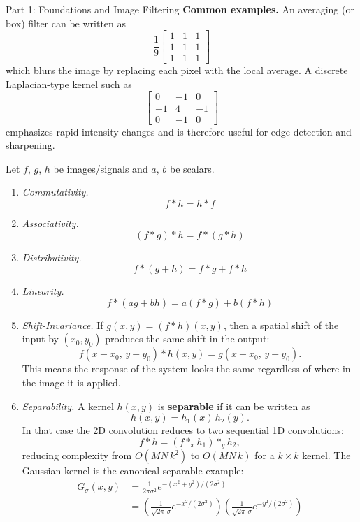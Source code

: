 \documentclass[letterpaper]{article}
\begin{document}
\begin{notes}{Part 1: Foundations and Image Filtering}
\textbf{Common examples.}
An averaging (or box) filter can be written as
$$
\frac{1}{9}
\begin{bmatrix}
1 & 1 & 1\\
1 & 1 & 1\\
1 & 1 & 1
\end{bmatrix}
$$
which blurs the image by replacing each pixel with the local average. A discrete Laplacian-type kernel such as
$$
\begin{bmatrix}
0 & -1 & 0\\
-1 & 4 & -1\\
0 & -1 & 0
\end{bmatrix}
$$
emphasizes rapid intensity changes and is therefore useful for edge detection and sharpening.


Let $f$, $g$, $h$ be images/signals and $a$, $b$ be scalars.

\begin{enumerate}
    \item \textit{Commutativity.} $$f * h = h * f$$
    \item \textit{Associativity.} $$(f * g) * h = f * (g * h)$$
    \item \textit{Distributivity.} $$f * (g + h) = f * g + f * h$$
    \item \textit{Linearity.} $$f * (ag + bh) = a(f * g) + b(f * h)$$
    \item \textit{Shift-Invariance.}
    If $g(x,y) = (f * h)(x,y)$, then a spatial shift of the input by $(x_0, y_0)$ produces the same shift in the output:
    $$f(x - x_0,\, y - y_0) * h(x,y) = g(x - x_0,\, y - y_0).$$
    This means the response of the system looks the same regardless of where in the image it is applied.
    \item \textit{Separability.} A kernel $h(x,y)$ is \textbf{separable} if it can be written as
    $$h(x,y) = h_1(x)\, h_2(y).$$
    In that case the 2D convolution reduces to two sequential 1D convolutions:
    $$f * h = (f *_x h_1) *_y h_2,$$
    reducing complexity from $O(MN\,k^2)$ to $O(MN\,k)$ for a $k\times k$ kernel. The Gaussian kernel is the canonical separable example:
    \begin{align*}
        G_\sigma(x,y) &= \frac{1}{2\pi\sigma^2}e^{-(x^2+y^2)/(2\sigma^2)}\\ 
        &= \left(\frac{1}{\sqrt{2\pi}\,\sigma}e^{-x^2/(2\sigma^2)}\right)\left(\frac{1}{\sqrt{2\pi}\,\sigma}e^{-y^2/(2\sigma^2)}\right)
    \end{align*}


\end{enumerate}
\end{notes}
\end{document}
